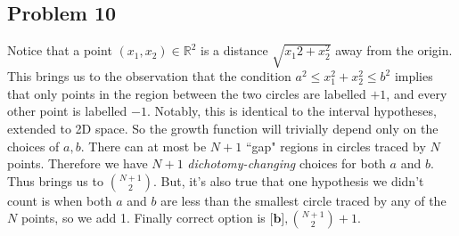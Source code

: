 \documentclass{article}
\begin{document}
\subsection*{Problem 10}
Notice that a point $(x_{1},x_{2})\in\mathbb{R}^{2}$ is a distance $\sqrt{x_{1}2 + x_{2}^2}$ away from the origin. This brings us to the observation that the condition $a^{2} \leq x_{1}^2 + x_{2}^2 \leq b^{2}$ implies that only points in the region between the two circles are labelled $+1$, and every other point is labelled $-1$. Notably, this is identical to the interval hypotheses, extended to 2D space. So the growth function will trivially depend only on the choices of $a,b$. There can at most be $N+1$ ``gap" regions in circles traced by $N$ points. Therefore we have $N+1$ \emph{dichotomy-changing} choices for both $a$ and $b$. Thus brings us to ${{N+1}\choose{2}}$. But, it's also true that one hypothesis we didn't count is when both $a$ and $b$ are less than the smallest circle traced by any of the $N$ points, so we add 1. Finally correct option is $\textbf{[b]}, {{N+1}\choose{2}} + 1$. 
\end{document}
